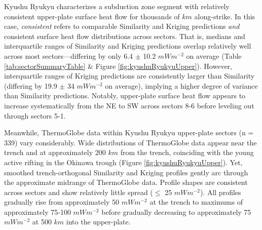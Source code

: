 Kyushu Ryukyu characterizes a subduction zone segment with relatively consistent upper-plate surface heat flow for thousands of \(km\) along-strike. In this case, \emph{consistent} refers to comparable Similarity and Kriging predictions \emph{and} consistent surface heat flow distributions across sectors. That is, medians and interquartile ranges of Similarity and Kriging predictions overlap relatively well across most sectors---differing by only 6.4 \(\pm\) 10.2 \(mWm^{-2}\) on average (Table \ref{tab:sectorSummaryTable} \& Figure \ref{fig:kyushuRyukyuUpper}). However, interquartile ranges of Kriging predictions are consistently larger than Similarity (differing by 19.9 \(\pm\) 34 \(mWm^{-2}\) on average), implying a higher degree of variance than Similarity predictions. Notably, upper-plate surface heat flow appears to increase systematically from the NE to SW across sectors 8-6 before leveling out through sectors 5-1.

Meanwhile, ThermoGlobe data within Kyushu Ryukyu upper-plate sectors (n = 339) vary considerably. Wide distributions of ThermoGlobe data appear near the trench and at approximately 200 \(km\) from the trench, coinciding with the young active rifting in the Okinawa trough (Figure \ref{fig:kyushuRyukyuUpper}). Yet, smoothed trench-orthogonal Similarity and Kriging profiles gently arc through the approximate midrange of ThermoGlobe data. Profile shapes are consistent across sectors and show relatively little spread (\(\leq\) 25 \(mWm^{-2}\)). All profiles gradually rise from approximately 50 \(mWm^{-2}\) at the trench to maximums of approximately 75-100 \(mWm^{-2}\) before gradually decreasing to approximately 75 \(mWm^{-2}\) at 500 \(km\) into the upper-plate.



